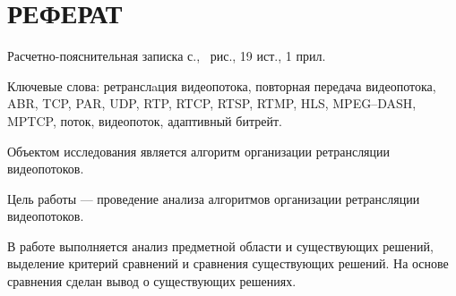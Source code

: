 \chapter*{РЕФЕРАТ}

Расчетно-пояснительная записка \pageref{LastPage} с., \totalfigures\ рис., 19 ист., 1 прил.

Ключевые слова: ретранслaция видеопотока, повторная передача видеопотока, ABR, TCP, PAR, UDP, RTP, RTCP, RTSP, RTMP, HLS, MPEG--DASH, MPTCP, поток, видеопоток, адаптивный битрейт.

Объектом исследования является алгоритм организации ретрансляции видеопотоков.

Цель работы --- проведение анализа алгоритмов организации ретрансляции видеопотоков.

В работе выполняется анализ предметной области и существующих решений, выделение критерий сравнений и сравнения существующих решений.
На основе сравнения сделан вывод о существующих решениях.
